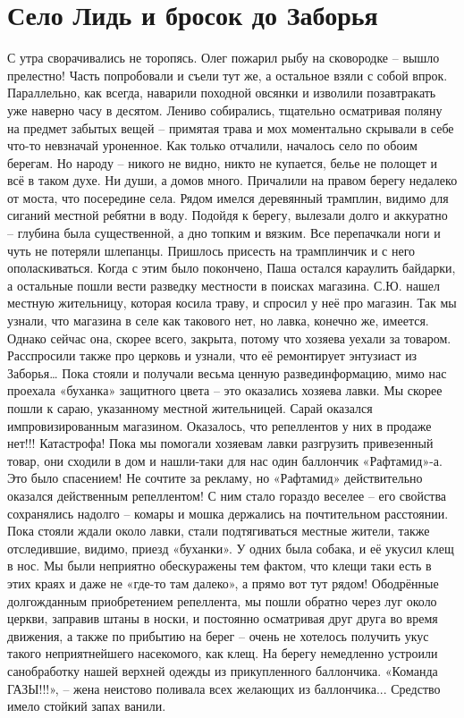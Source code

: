 \chapter{Село Лидь и бросок до Заборья} 

С утра сворачивались не торопясь. Олег пожарил рыбу на сковородке – вышло прелестно! Часть попробовали и съели тут же, а остальное взяли с собой впрок. Параллельно, как всегда, наварили походной овсянки и изволили позавтракать уже наверно часу в десятом. Лениво собирались, тщательно осматривая поляну на предмет забытых вещей – примятая трава и мох моментально скрывали в себе что-то невзначай уроненное.
Как только отчалили, началось село по обоим берегам. Но народу – никого не видно, никто не купается, белье не полощет и всё в таком духе. Ни души, а домов много. Причалили на правом берегу недалеко от моста, что посередине села. Рядом имелся деревянный трамплин, видимо для сиганий местной ребятни в воду. Подойдя к берегу, вылезали долго и аккуратно – глубина была существенной, а дно топким и вязким.  Все перепачкали ноги и чуть не потеряли шлепанцы. Пришлось присесть на трамплинчик и с него ополаскиваться. Когда с этим было покончено, Паша остался караулить байдарки, а остальные пошли вести разведку местности в поисках магазина. С.Ю. нашел местную жительницу, которая косила траву, и спросил у неё про магазин. Так мы узнали, что магазина в селе как такового нет, но лавка, конечно же, имеется. Однако сейчас она, скорее всего, закрыта, потому что хозяева уехали за товаром. Расспросили также про церковь и узнали, что её ремонтирует энтузиаст из Заборья… 
Пока стояли и получали весьма ценную развединформацию, мимо нас проехала «буханка» защитного цвета – это оказались хозяева лавки. Мы скорее пошли к сараю, указанному местной жительницей. Сарай оказался импровизированным магазином. Оказалось, что репеллентов у них в продаже нет!!! Катастрофа! Пока мы помогали хозяевам лавки разгрузить привезенный товар, они сходили в дом и нашли-таки для нас один баллончик «Рафтамид»-а. Это было спасением! Не сочтите за рекламу, но «Рафтамид» действительно оказался действенным репеллентом! С ним стало гораздо веселее – его свойства сохранялись надолго – комары и мошка держались на почтительном расстоянии. 
Пока стояли ждали около лавки, стали подтягиваться местные жители, также отследившие, видимо, приезд «буханки». У одних была собака, и её укусил клещ в нос. Мы были неприятно обескуражены тем фактом, что клещи таки есть в этих краях и даже не «где-то там далеко», а прямо вот тут рядом!
Ободрённые долгожданным приобретением репеллента, мы пошли обратно через луг около церкви, заправив штаны в носки, и постоянно осматривая друг друга во время движения, а также по прибытию на берег – очень не хотелось получить укус такого неприятнейшего насекомого, как клещ. На берегу немедленно устроили санобработку нашей верхней одежды из прикупленного баллончика. «Команда ГАЗЫ!!!», – жена неистово поливала всех желающих из баллончика... Средство имело стойкий запах ванили.
